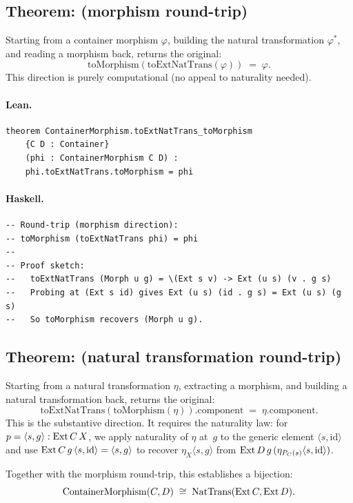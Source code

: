 \documentclass[11pt,a4paper]{article}
\begin{document}
\subsection{Theorem:  (morphism round-trip)}

\begin{thm}
Starting from a container morphism $\varphi$, building the natural
transformation $\varphi^*$, and reading a morphism back, returns the
original:
\[
  \mathrm{toMorphism}(\mathrm{toExtNatTrans}(\varphi)) \;=\; \varphi.
\]
This direction is purely computational (no appeal to naturality needed).
\end{thm}

\paragraph{Lean.}
\begin{lstlisting}[style=lean]
theorem ContainerMorphism.toExtNatTrans_toMorphism
    {C D : Container}
    (phi : ContainerMorphism C D) :
    phi.toExtNatTrans.toMorphism = phi
\end{lstlisting}

\paragraph{Haskell.}
\begin{lstlisting}[style=haskell]
-- Round-trip (morphism direction):
-- toMorphism (toExtNatTrans phi) = phi
--
-- Proof sketch:
--   toExtNatTrans (Morph u g) = \(Ext s v) -> Ext (u s) (v . g s)
--   Probing at (Ext s id) gives Ext (u s) (id . g s) = Ext (u s) (g s)
--   So toMorphism recovers (Morph u g).
\end{lstlisting}


\subsection{Theorem: 
  (natural transformation round-trip)}

\begin{thm}
Starting from a natural transformation $\eta$, extracting a morphism, and
building a natural transformation back, returns the original:
\[
  \mathrm{toExtNatTrans}(\mathrm{toMorphism}(\eta)).\mathrm{component}
  \;=\; \eta.\mathrm{component}.
\]
This is the substantive direction.  It requires the naturality law: for
$p = \langle s, g \rangle : \mathrm{Ext}\,C\,X$, we apply naturality of $\eta$ at~$g$
to the generic element $\langle s, \mathrm{id} \rangle$ and use
$\mathrm{Ext}\,C\,g\,\langle s, \mathrm{id} \rangle = \langle s, g \rangle$
to recover $\eta_X\langle s, g \rangle$ from
$\mathrm{Ext}\,D\,g\,(\eta_{P_C(s)}\langle s, \mathrm{id} \rangle)$.

Together with the morphism round-trip, this establishes a bijection:
\[
  \mathrm{ContainerMorphism}(C, D)
  \;\cong\;
  \mathrm{NatTrans}(\mathrm{Ext}\,C, \mathrm{Ext}\,D).
\]
\end{thm}
\end{document}
